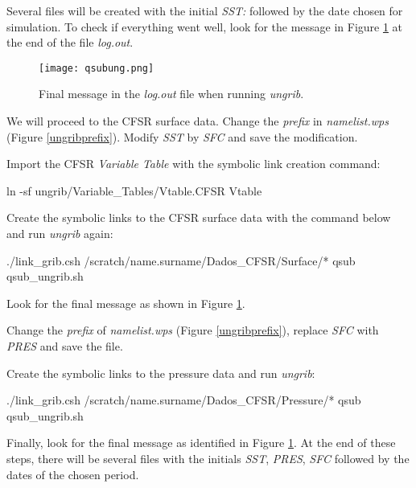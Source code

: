 \noindent Several files will be created with the initial \textit {SST:} followed by the date chosen for simulation. 
To check if everything went well, look for the message in Figure \textcolor{bleu_cite}{\ref{ungribsucess}} at the end of the file
\textit{log.out}.
\bigskip

\begin{figure}[H]
    \centering
    \texttt{[image: qsubung.png]}
    \caption{Final message in the \textit{log.out} file when running \textit{ungrib}.}
    \label{ungribsucess}
\end{figure}
\bigskip

\noindent We will proceed to the CFSR surface data. Change the \textit{prefix} in \textit{namelist.wps} (Figure \textcolor{bleu_cite}{\ref{ungribprefix}}). 
Modify \textit{SST} by \textit{SFC} and save the modification.

\bigskip

\noindent Import the CFSR \textit{Variable Table} with the symbolic link creation command:
\bigskip

\begin{bashcode}
ln -sf ungrib/Variable_Tables/Vtable.CFSR Vtable
\end{bashcode}
\bigskip

\noindent Create the symbolic links to the CFSR surface data with the command below and run \textit{ungrib} again:
\bigskip

\begin{bashcode}
./link_grib.csh /scratch/name.surname/Dados_CFSR/Surface/*
qsub qsub_ungrib.sh
\end{bashcode}
\bigskip

\noindent Look for the final message as shown in Figure \textcolor{bleu_cite}{\ref{ungribsucess}}.
\bigskip

\noindent Change the \textit{prefix} of \textit{namelist.wps} (Figure \textcolor{bleu_cite}{\ref{ungribprefix}}), replace \textit {SFC} with \textit{PRES} and save the file.
\bigskip

\noindent Create the symbolic links to the pressure data and run \textit{ungrib}:
\bigskip

\begin{bashcode}
./link_grib.csh /scratch/name.surname/Dados_CFSR/Pressure/*
qsub qsub_ungrib.sh
\end{bashcode}
\bigskip

\noindent Finally, look for the final message as identified in Figure \textcolor{bleu_cite}{\ref{ungribsucess}}. 
At the end of these steps, there will be several files with the initials \textit {SST}, \textit {PRES}, \textit {SFC} followed by the
dates of the chosen period.
\bigskip



